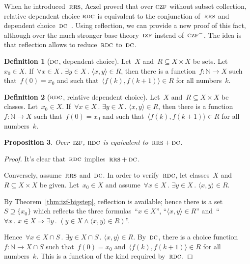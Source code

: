 \documentclass[oneside,reqno]{amsart}
\theoremstyle{definition}
\newtheorem{defn}{Definition}[section]
\theoremstyle{plain}
\newtheorem{prop}[defn]{Proposition}
\theoremstyle{remark}
\newcommand{\NN}{\mathbb{N}}
\renewcommand{\_}{\mathpunct{.}\,}
\newcommand{\?}{\,{:}\,}
\newcommand{\IZF}{\textsc{izf}}
\newcommand{\CZF}{\textsc{czf}}
\newcommand{\RRS}{\textsc{rrs}}
\newcommand{\RDC}{\textsc{rdc}}
\newcommand{\DC}{\textsc{dc}}
\begin{document}
When he introduced~$\RRS$, Aczel proved that over $\CZF$ without subset
collection, relative dependent choice $\RDC$ is equivalent to the conjunction
of~$\RRS$ and dependent choice~$\DC$~\cite[Theorem~2.4]{aczel:rrs}. Using
reflection, we can provide a new proof of this fact, although over the much
stronger base theory~$\IZF$ instead of~$\CZF^{-}$. The idea is that reflection
allows to reduce~$\RDC$ to~$\DC$.

\begin{defn}[$\DC$, dependent choice]
Let~$X$ and~$R \subseteq X \times X$ be sets. Let~$x_0 \in X$.
If~$\forall x \in X\_ \exists y \in X\_ \langle x,y \rangle \in R$,
then there is a function~$f : \NN \to X$ such that~$f(0) = x_0$ and
such that~$\langle f(k), f(k+1) \rangle \in R$ for all numbers~$k$.
\end{defn}

\begin{defn}[$\RDC$, relative dependent choice]
Let~$X$ and~$R \subseteq X \times X$ be classes. Let~$x_0 \in X$.
If~$\forall x \in X\_ \exists y \in X\_ \langle x,y \rangle \in R$,
then there is a function~$f : \NN \to X$ such that~$f(0) = x_0$ and
such that~$\langle f(k), f(k+1) \rangle \in R$ for all numbers~$k$.
\end{defn}

\begin{prop}Over~$\IZF$, $\RDC$ is equivalent to~$\RRS + \DC$.
\end{prop}

\begin{proof}It's clear that~$\RDC$ implies~$\RRS + \DC$. %

Conversely, assume~$\RRS$ and~$\DC$. In order to verify~$\RDC$, let classes~$X$
and~$R \subseteq X \times X$ be given. Let~$x_0 \in X$ and assume~$\forall x
\in X\_ \exists y \in X\_ \langle x,y \rangle \in R$.

By Theorem~\ref{thm:izf-bigstep}, reflection is available; hence there is a
set~$S \supseteq \{x_0\}$ which reflects the three formulas~``$x \in X$'', ``$\langle x,y
\rangle \in R$'' and~``$\forall x\_ x \in X \Rightarrow \exists y\_ (y \in X \wedge \langle x,y
\rangle \in R)$''.

Hence~$\forall x \in X \cap S\_ \exists y \in X \cap S\_ \langle x,y \rangle
\in R$. By~$\DC$, there is a choice function~$f : \NN \to X \cap S$ such
that~$f(0) = x_0$ and~$\langle f(k), f(k+1) \rangle \in R$ for all numbers~$k$.
This is a function of the kind required by~$\RDC$.
\end{proof}
\end{document}
